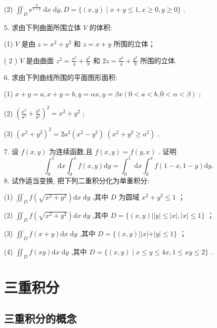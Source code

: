 (2) \({\iint }_{D}{\mathrm{e}}^{\frac{y}{x + y}}\mathrm{\;d}x\mathrm{\;d}y,D = \{ \left( {x,y}\right)  \mid  x + y \leq  1,x \geq  0,y \geq  0\}\) .

5. 求由下列曲面所围立体 \(V\) 的体积:

(1) \(V\) 是由 \(z = {x}^{2} + {y}^{2}\) 和 \(z = x + y\) 所围的立体；

( 2 ) \(V\) 是由曲面 \({z}^{2} = \frac{{x}^{2}}{4} + \frac{{y}^{2}}{9}\) 和 \({2z} = \frac{{x}^{2}}{4} + \frac{{y}^{2}}{9}\) 所围的立体.

6. 求由下列曲线所围的平面图形面积:

(1) \(x + y = a,x + y = b,y = {\alpha x},y = {\beta x}\left( {0 < a < b,0 < \alpha  < \beta }\right)\) ;

(2) \({\left( \frac{{x}^{2}}{{a}^{2}} + \frac{{y}^{2}}{{b}^{2}}\right) }^{2} = {x}^{2} + {y}^{2}\) ;

(3) \({\left( {x}^{2} + {y}^{2}\right) }^{2} = 2{a}^{2}\left( {{x}^{2} - {y}^{2}}\right) \;\left( {{x}^{2} + {y}^{2} \geq  {a}^{2}}\right)\) .

7. 设 \(f\left( {x,y}\right)\) 为连续函数,且 \(f\left( {x,y}\right)  = f\left( {y,x}\right)\) . 证明
\[
{\int }_{0}^{1}\mathrm{\;d}x{\int }_{0}^{x}f\left( {x,y}\right) \mathrm{d}y = {\int }_{0}^{1}\mathrm{\;d}x{\int }_{0}^{x}f\left( {1 - x,1 - y}\right) \mathrm{d}y.
\]
8. 试作适当变换, 把下列二重积分化为单重积分:

(1) \({\iint }_{D}f\left( \sqrt{{x}^{2} + {y}^{2}}\right) \mathrm{d}x\mathrm{\;d}y\) ,其中 \(D\) 为圆域 \({x}^{2} + {y}^{2} \leq  1\) ；

(2) \({\iint }_{D}f\left( \sqrt{{x}^{2} + {y}^{2}}\right) \mathrm{d}x\mathrm{\;d}y\) ,其中 \(D = \{ \left( {x,y}\right) \left| \right| y\left|  \leq  \right| x\left| ,\right| x \mid   \leq  1\}\) ；

(3) \({\iint }_{D}f\left( {x + y}\right) \mathrm{d}x\mathrm{\;d}y\) ,其中 \(D = \{ \left( {x,y}\right) \left| \right| x\left| +\right| y \mid   \leq  1\}\) ；

(4) \({\iint }_{D}f\left( {xy}\right) \mathrm{d}x\mathrm{\;d}y\) ,其中 \(D = \{ \left( {x,y}\right)  \mid  x \leq  y \leq  {4x},1 \leq  {xy} \leq  2\}\) .

\section{三重积分}

\subsection{三重积分的概念}

